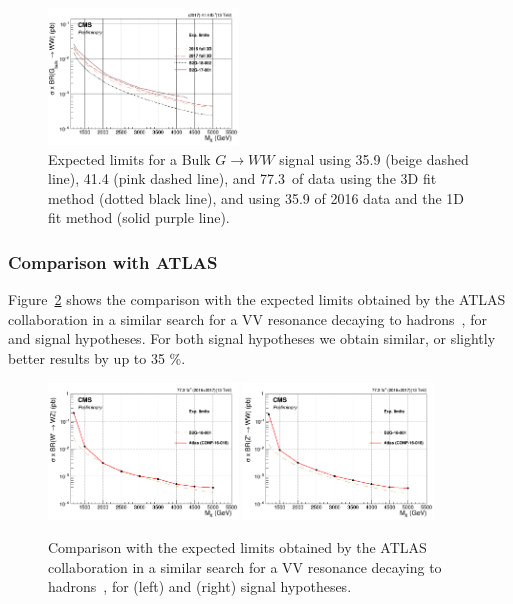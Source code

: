 \begin{figure}[h!]
\centering
\includegraphics[width=0.45\textwidth]{figures/analysis/search3/AN-17-303/limits/compareAll_BulkGWW.png}
\caption{Expected limits for a Bulk $G\rightarrow WW$ signal using 35.9 (beige dashed line), 41.4 (pink dashed line), and 77.3~\fbinv of data using the 3D fit method (dotted black line), and using 35.9 \fbinv of 2016 data and the 1D fit method (solid purple line).}
\label{fig:limitsCompare2}
\end{figure}
\subsubsection{Comparison with ATLAS}
\label{sec:limitcompareatlas}
Figure~\ref{fig:limitsCompareATLAS} shows the comparison with the expected limits obtained by the ATLAS collaboration in a similar search for a VV resonance decaying to hadrons~\cite{ATLAS-CONF-2018-016}, for \PWpr and \PZpr signal hypotheses. For both signal hypotheses we obtain similar, or slightly better results by up to 35 \%.
\begin{figure}[h!]
\centering
\includegraphics[width=0.45\textwidth]{figures/analysis/search3/AN-17-303/limits/limits_WprimeWZ_compare_ATLAS.png}
\includegraphics[width=0.45\textwidth]{figures/analysis/search3/AN-17-303/limits/limits_ZprimeWW_compare_ATLAS.png}
\caption{Comparison with the expected limits obtained by the ATLAS collaboration in a similar search for a VV resonance decaying to hadrons~\cite{ATLAS-CONF-2018-016}, for \PWpr (left) and \PZpr (right) signal hypotheses.}
\label{fig:limitsCompareATLAS}
\end{figure}
